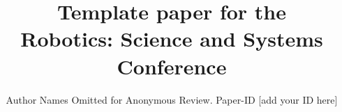\documentclass[conference]{IEEEtran} %
\begin{document}
\title{Template paper for the \\Robotics: Science and Systems Conference}

\author{Author Names Omitted for Anonymous Review. Paper-ID [add your ID here]}





% 


\maketitle
\end{document}
